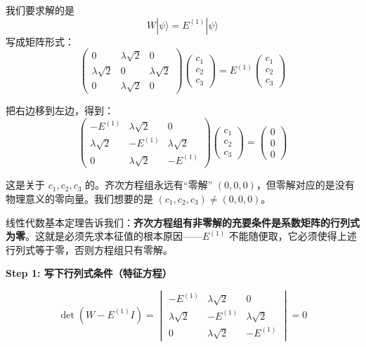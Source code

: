 \begin{insightbox}
我们要求解的是
\[
W |\psi\rangle = E^{(1)} |\psi\rangle
\]
写成矩阵形式：
\[
\begin{pmatrix}
0 & \lambda\sqrt{2} & 0 \\
\lambda\sqrt{2} & 0 & \lambda\sqrt{2} \\
0 & \lambda\sqrt{2} & 0
\end{pmatrix}
\begin{pmatrix} c_1 \\ c_2 \\ c_3 \end{pmatrix}
= E^{(1)}
\begin{pmatrix} c_1 \\ c_2 \\ c_3 \end{pmatrix}
\]

把右边移到左边，得到：
\[
\begin{pmatrix}
-E^{(1)} & \lambda\sqrt{2} & 0 \\
\lambda\sqrt{2} & -E^{(1)} & \lambda\sqrt{2} \\
0 & \lambda\sqrt{2} & -E^{(1)}
\end{pmatrix}
\begin{pmatrix} c_1 \\ c_2 \\ c_3 \end{pmatrix}
= \begin{pmatrix} 0 \\ 0 \\ 0 \end{pmatrix}
\]

这是关于 $c_1, c_2, c_3$ 的。齐次方程组永远有``零解'' $(0,0,0)$，但零解对应的是没有物理意义的零向量。我们想要的是 $(c_1, c_2, c_3) \neq (0,0,0)$。

线性代数基本定理告诉我们：\textbf{齐次方程组有非零解的充要条件是系数矩阵的行列式为零}。这就是必须先求本征值的根本原因——$E^{(1)}$ 不能随便取，它必须使得上述行列式等于零，否则方程组只有零解。
\end{insightbox}

\textbf{Step 1: 写下行列式条件（特征方程）}

\[
\det(W - E^{(1)} I) =
\begin{vmatrix}
-E^{(1)} & \lambda\sqrt{2} & 0 \\
\lambda\sqrt{2} & -E^{(1)} & \lambda\sqrt{2} \\
0 & \lambda\sqrt{2} & -E^{(1)}
\end{vmatrix}
= 0
\]

